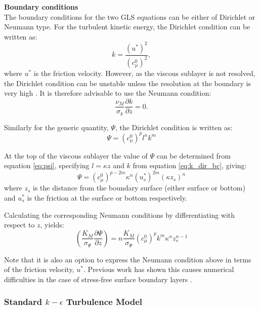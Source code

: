 \par{\textbf{Boundary conditions}\\}
The boundary conditions for the two GLS equations can be either of Dirichlet or Neumann
type. For the turbulent kinetic energy, the Dirichlet condition can be written as:
\begin{equation}
k=\frac{\left(u^*\right)^2}{\left(c_\mu^0\right)^2},
\label{eq:k_dir_bc}
\end{equation}
where $u^*$ is the friction velocity. However, as the viscous sublayer is not
resolved, the Dirichlet condition can be unstable unless the resolution at the
boundary is very high \citep{burchard1999}. It is therefore advisable to use
the Neumann condition:
\begin{equation}
\frac{\nu_M}{\sigma_k}\frac{\partial k}{\partial z} = 0.
\end{equation}

Similarly for the generic quantity, $\Psi$, the Dirichlet condition is written
as:
\begin{equation}
\Psi=\left(c_\mu^0\right)^{p}l^nk^m
\end{equation}

At the top of the viscous sublayer the value of $\Psi$ can be determined from equation \ref{eq:psi}, 
specifying $l=\kappa z$ and $k$ from equation \ref{eq:k_dir_bc}, giving:
\begin{equation}
\Psi=\left(c_\mu^0\right)^{p-2m}\kappa^n\left(u_s^*\right)^{2m}\left(\kappa z_s\right)^n
\end{equation}
where $z_s$ is the distance from the boundary surface (either surface or bottom) and $u_s^*$ is the 
friction at the surface or bottom respectively.

Calculating the corresponding Neumann  conditions by differentiating with respect to $z$, yields:
\begin{equation}
\left(\frac{K_M}{\sigma_{\Psi}}\frac{\partial\Psi}{\partial z}\right) = n\frac{K_M}{\sigma_{\Psi}} \left(c_\mu^0\right)^p k^m \kappa^n z_s^{n-1}
\label{eq:psi-flux-bc}
\end{equation}

Note that it is also an option to express the Neumann condition above in terms
of the friction velocity, $u^*$. Previous work has shown this causes numerical
difficulties in the case of stress-free surface boundary layers \citep{burchard1999}.


\subsubsection{Standard $k-\epsilon$ Turbulence Model}\label{sec:kepsilon}

